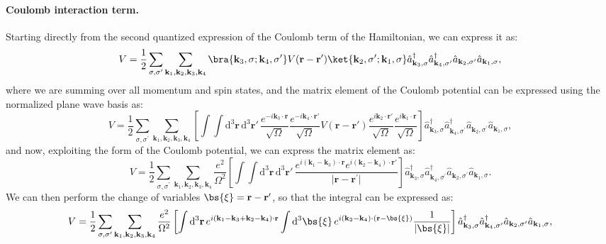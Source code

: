 \paragraph{Coulomb interaction term.}
Starting directly from the second quantized expression of the Coulomb term of the Hamiltonian, we can express it as:
\[
    V = \frac{1}{2} \sum_{\sigma,\sigma^{\prime}} \sum_{\mathbf{k}_1, \mathbf{k}_2, \mathbf{k}_3, \mathbf{k}_4} \bra{\mathbf{k}_3, \sigma; \mathbf{k}_4, \sigma^{\prime}} V(\mathbf{r} - \mathbf{r}') \ket{\mathbf{k}_2, \sigma^{\prime}; \mathbf{k}_1, \sigma} \hat{a}_{\mathbf{k}_3, \sigma}^\dagger \hat{a}_{\mathbf{k}_4, \sigma^{\prime}}^\dagger \hat{a}_{\mathbf{k}_2, \sigma^{\prime}} \hat{a}_{\mathbf{k}_1, \sigma},
\]
where we are summing over all momentum and spin states, and the matrix element of the Coulomb potential can be expressed using the normalized plane wave basis as:
\[
    V = \frac{1}{2} \sum_{\sigma,\sigma^{\prime}} \sum_{\mathbf{k}_1, \mathbf{k}_2, \mathbf{k}_3, \mathbf{k}_4} \left[ \int \int \mathrm{d}^3 \mathbf{r} \, \mathrm{d}^3 \mathbf{r}' \, \frac{e^{-i \mathbf{k}_3 \cdot \mathbf{r}}}{\sqrt{\Omega}} \frac{e^{-i \mathbf{k}_4 \cdot \mathbf{r}'}}{\sqrt{\Omega}} V(\mathbf{r} - \mathbf{r}') \frac{e^{i \mathbf{k}_2 \cdot \mathbf{r}'}}{\sqrt{\Omega}} \frac{e^{i \mathbf{k}_1 \cdot \mathbf{r}}}{\sqrt{\Omega}} \right] \hat{a}_{\mathbf{k}_3, \sigma}^\dagger \hat{a}_{\mathbf{k}_4, \sigma^{\prime}}^\dagger \hat{a}_{\mathbf{k}_2, \sigma^{\prime}} \hat{a}_{\mathbf{k}_1, \sigma},
\]
and now, exploiting the form of the Coulomb potential, we can express the matrix element as:
\[
    V = \frac{1}{2} \sum_{\sigma,\sigma^{\prime}} \sum_{\mathbf{k}_1, \mathbf{k}_2, \mathbf{k}_3, \mathbf{k}_4} \frac{e^2}{\Omega^2}\left[ \int \int \mathrm{d}^3 \mathbf{r} \, \mathrm{d}^3 \mathbf{r}' \, \frac{e^{i (\mathbf{k}_1 - \mathbf{k}_3) \cdot \mathbf{r}} e^{i (\mathbf{k}_2 - \mathbf{k}_4) \cdot \mathbf{r}'}}{\vert \mathbf{r} - \mathbf{r}^{\prime} \vert} \right] \hat{a}_{\mathbf{k}_3, \sigma}^\dagger \hat{a}_{\mathbf{k}_4, \sigma^{\prime}}^\dagger \hat{a}_{\mathbf{k}_2, \sigma^{\prime}} \hat{a}_{\mathbf{k}_1, \sigma}.
\]
We can then perform the change of variables \(\bs{\xi} = \mathbf{r} - \mathbf{r}'\), so that the integral can be expressed as:
\[
    V = \frac{1}{2} \sum_{\sigma,\sigma^{\prime}} \sum_{\mathbf{k}_1, \mathbf{k}_2, \mathbf{k}_3, \mathbf{k}_4} \frac{e^2}{\Omega^2} \left[ \int \mathrm{d}^3 \mathbf{r} \, e^{i (\mathbf{k}_1 - \mathbf{k}_3 + \mathbf{k}_2 - \mathbf{k}_4) \cdot \mathbf{r}} \int \mathrm{d}^3 \bs{\xi} \, e^{i (\mathbf{k}_2 - \mathbf{k}_4) \cdot (\mathbf{r} - \bs{\xi})} \frac{1}{\vert \bs{\xi} \vert} \right] \hat{a}_{\mathbf{k}_3, \sigma}^\dagger \hat{a}_{\mathbf{k}_4, \sigma^{\prime}}^\dagger \hat{a}_{\mathbf{k}_2, \sigma^{\prime}} \hat{a}_{\mathbf{k}_1, \sigma},
\]

